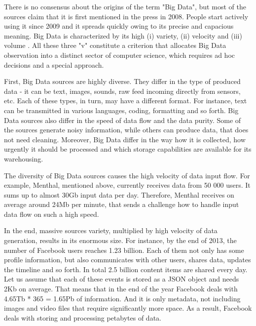 There is no consensus about the origins of the term "Big Data", but most of the sources claim that it is first mentioned in the press in 2008.
People start actively using it since 2009 and it spreads quickly owing to its precise and capacious meaning. 
Big Data is characterized by its high (i) variety, (ii) velocity and (iii) volume \cite{Beyer2011}. 
All these three "v" constitute a criterion that allocates Big Data observation into a distinct sector of computer science, which requires ad hoc decisions and a special approach.

First, Big Data sources are highly diverse.
They differ in the type of produced data - it can be text, images, sounds, raw feed incoming directly from sensors, etc.
Each of these types, in turn, may have a different format.
For instance, text can be transmitted in various languages, coding, formatting and so forth.
Big Data sources also differ in the speed of data flow and the data purity.  
Some of the sources generate noisy information, while others can produce data, that does not need cleaning.
Moreover, Big Data differ in the way how it is collected, how urgently it should be processed and which storage capabilities are available for its warehousing.

The diversity of Big Data sources causes the high velocity of data input flow.
For example, Menthal, mentioned above, currently receives data from 50 000 users.
It sums up to almost 30Gb input data per day.
Therefore, Menthal receives on average around 24Mb per minute, that sends a challenge how to handle input data flow on such a high speed.

In the end, massive sources variety, multiplied by high velocity of data generation, results in its enormous size.
For instance, by the end of 2013, the number of Facebook users reaches 1.23 billion.
Each of them not only has some profile information, but also communicates with other users, shares data, updates the timeline and so forth.
In total 2.5 billion content items are shared every day.
Let us assume that each of these events is stored as a JSON object and needs 2Kb on average.
That means that in the end of the year Facebook deals with 4.65Tb * 365 = 1.65Pb of information.
And it is only metadata, not including images and video files that require significantly more space. 
As a result, Facebook deals with storing and processing petabytes of data.

